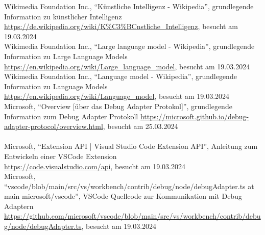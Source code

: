 \documentclass[a4paper,12pt,ngerman]{scrartcl}
\begin{document}
Wikimedia Foundation Inc.,  ``Künstliche Intelligenz - Wikipedia'', grundlegende Information zu künstlicher Intelligenz\\
\url{https://de.wikipedia.org/wiki/K\%C3\%BCnstliche_Intelligenz}, besucht am 19.03.2024\\
Wikimedia Foundation Inc.,  ``Large language model - Wikipedia'', grundlegende Information zu Large Language Models\\
\url{https://en.wikipedia.org/wiki/Large_language_model}, besucht am 19.03.2024\\
Wikimedia Foundation Inc.,  ``Language model - Wikipedia'', grundlegende Information zu Language Models \\
\url{https://en.wikipedia.org/wiki/Language_model}, besucht am 19.03.2024\\
Microsoft, ``Overview [über das Debug Adapter Protokol]'', grundlegende Information zum Debug Adapter Protokoll
\url{https://microsoft.github.io/debug-adapter-protocol/overview.html}, besucht am 25.03.2024\\
\vspace{1em}\\
Microsoft, ``Extension API | Visual Studio Code Extension API'', Anleitung zum Entwickeln einer VSCode Extension\\
\url{https://code.visualstudio.com/api}, besucht am 19.03.2024\\
Microsoft, ``vscode/blob/main/src/vs/workbench/contrib/debug/node/debugAdapter.ts at main microsoft/vscode'', VSCode Quellcode zur Kommunikation mit Debug Adaptern\\
\url{https://github.com/microsoft/vscode/blob/main/src/vs/workbench/contrib/debug/node/debugAdapter.ts}, besucht am 19.03.2024
\end{document}
